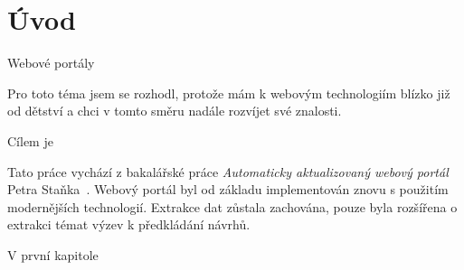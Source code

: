 \chapter{Úvod}
Webové portály \blindtext

Pro toto téma jsem se rozhodl, protože mám k webovým technologiím blízko již od dětství a chci v tomto směru nadále rozvíjet své znalosti.

Cílem je \blindtext

Tato práce vychází z bakalářské práce \emph{Automaticky aktualizovaný webový portál} Petra Staňka~\cite{bib:stanek}.
Webový portál byl od základu implementován znovu s použitím modernějších technologií. Extrakce dat zůstala zachována, pouze byla rozšířena o extrakci témat výzev k předkládání návrhů.

V první kapitole \blindtext